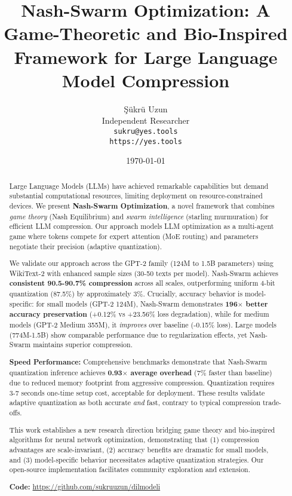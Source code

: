 \documentclass[11pt]{article}
\title{Nash-Swarm Optimization: A Game-Theoretic and Bio-Inspired Framework for Large Language Model Compression}
\author{
    Şükrü Uzun \\
    Independent Researcher \\
    \texttt{sukru@yes.tools} \\
    \texttt{https://yes.tools}
}
\date{\today}
\begin{document}
\maketitle

\begin{abstract}
Large Language Models (LLMs) have achieved remarkable capabilities but demand substantial computational resources, limiting deployment on resource-constrained devices. We present \textbf{Nash-Swarm Optimization}, a novel framework that combines \textit{game theory} (Nash Equilibrium) and \textit{swarm intelligence} (starling murmuration) for efficient LLM compression. Our approach models LLM optimization as a multi-agent game where tokens compete for expert attention (MoE routing) and parameters negotiate their precision (adaptive quantization).

We validate our approach across the GPT-2 family (124M to 1.5B parameters) using WikiText-2 with enhanced sample sizes (30-50 texts per model). Nash-Swarm achieves \textbf{consistent 90.5-90.7\% compression} across all scales, outperforming uniform 4-bit quantization (87.5\%) by approximately 3\%. Crucially, accuracy behavior is model-specific: for small models (GPT-2 124M), Nash-Swarm demonstrates \textbf{196$\times$ better accuracy preservation} (+0.12\% vs +23.56\% loss degradation), while for medium models (GPT-2 Medium 355M), it \textit{improves} over baseline (-0.15\% loss). Large models (774M-1.5B) show comparable performance due to regularization effects, yet Nash-Swarm maintains superior compression.

\textbf{Speed Performance:} Comprehensive benchmarks demonstrate that Nash-Swarm quantization inference achieves \textbf{0.93$\times$ average overhead} (7\% faster than baseline) due to reduced memory footprint from aggressive compression. Quantization requires 3-7 seconds one-time setup cost, acceptable for deployment. These results validate adaptive quantization as both accurate \textit{and} fast, contrary to typical compression trade-offs.

This work establishes a new research direction bridging game theory and bio-inspired algorithms for neural network optimization, demonstrating that (1) compression advantages are scale-invariant, (2) accuracy benefits are dramatic for small models, and (3) model-specific behavior necessitates adaptive quantization strategies. Our open-source implementation facilitates community exploration and extension.

\textbf{Code:} \url{https://github.com/sukruuzun/dilmodeli}
\end{abstract}
\end{document}
